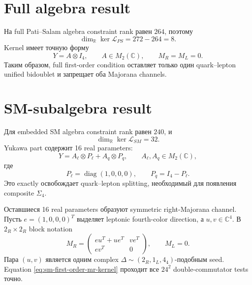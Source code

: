 \section{Full algebra result}

На full Pati--Salam algebra constraint rank равен \(264\), поэтому
\begin{equation}
 \dim_\mathbb R\ker\mathcal L_{PS}=272-264=8.
\end{equation}
Kernel имеет точную форму
\begin{equation}
 \boxed{
 Y=A\otimes I_4,
 \qquad
 A\in M_2(\mathbb C),
 \qquad
 M_R=M_L=0.}
\end{equation}
Таким образом, full first-order condition оставляет только один
quark--lepton unified bidoublet и запрещает оба Majorana channels.

\section{SM-subalgebra result}

Для embedded SM algebra constraint rank равен \(240\), и
\begin{equation}
 \boxed{\dim_\mathbb R\ker\mathcal L_{SM}=32.}
\end{equation}
Yukawa part содержит 16 real parameters:
\begin{equation}
 Y=A_\ell\otimes P_\ell+A_q\otimes P_q,
 \qquad
 A_\ell,A_q\in M_2(\mathbb C),
\end{equation}
где
\begin{equation}
 P_\ell=\operatorname{diag}(1,0,0,0),
 \qquad
 P_q=I_4-P_\ell.
\end{equation}
Это exactly освобождает quark--lepton splitting, необходимый для появления
composite \(\Sigma_4\).

Оставшиеся 16 real parameters образуют symmetric right-Majorana channel.
Пусть \(e=(1,0,0,0)^T\) выделяет leptonic fourth-color direction, а
\(u,v\in\mathbb C^4\). В \(2_R\times2_R\) block notation
\begin{equation}
 \boxed{
 M_R=
 \begin{pmatrix}
 eu^T+ue^T&ve^T\\
 ev^T&0
 \end{pmatrix},
 \qquad
 M_L=0.}
 \label{eq:sm-first-order-mr-kernel}
\end{equation}
Пара \((u,v)\) является одним complex
\(\Delta\sim(2_R,1_L,4_4)\)-подобным seed. Equation
\eqref{eq:sm-first-order-mr-kernel} проходит все \(24^2\) double-commutator
tests точно.

